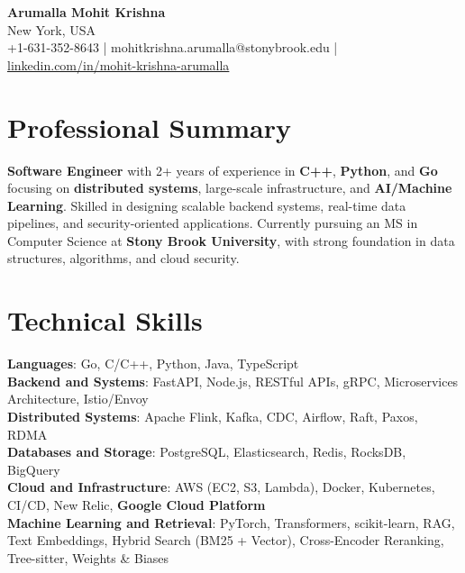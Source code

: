 \documentclass[letterpaper,11pt]{article}
\begin{document}
\begin{center}
  {\Large \textbf{Arumalla Mohit Krishna}} \\
  New York, USA \\
  +1-631-352-8643 \enspace | \enspace mohitkrishna.arumalla@stonybrook.edu \enspace | \enspace \href{https://www.linkedin.com/in/mohit-krishna-arumalla}{linkedin.com/in/mohit-krishna-arumalla}
\end{center}

\section{Professional Summary}
  \begin{itemize}[leftmargin=0.15in, label={}]
    \small{\item{
     \textbf{Software Engineer} with 2+ years of experience in \textbf{C++}, \textbf{Python}, and \textbf{Go} focusing on \textbf{distributed systems}, large-scale infrastructure, and \textbf{AI/Machine Learning}. Skilled in designing scalable backend systems, real-time data pipelines, and security-oriented applications. Currently pursuing an MS in Computer Science at \textbf{Stony Brook University}, with strong foundation in data structures, algorithms, and cloud security.
    }}
  \end{itemize}
\vspace{-16pt}

\section{Technical Skills}
 \begin{itemize}[leftmargin=0.15in, label={}]
    \small{\item{
     \textbf{Languages}: Go, C/C++, Python, Java, TypeScript \\
     \textbf{Backend and Systems}: FastAPI, Node.js, RESTful APIs, gRPC, Microservices Architecture, Istio/Envoy \\
     \textbf{Distributed Systems}: Apache Flink, Kafka, CDC, Airflow, Raft, Paxos, RDMA \\
     \textbf{Databases and Storage}: PostgreSQL, Elasticsearch, Redis, RocksDB, BigQuery \\
     \textbf{Cloud and Infrastructure}: AWS (EC2, S3, Lambda), Docker, Kubernetes, CI/CD, New Relic, \textbf{Google Cloud Platform} \\
     \textbf{Machine Learning and Retrieval}: PyTorch, Transformers, scikit-learn, RAG, Text Embeddings, Hybrid Search (BM25 + Vector), Cross-Encoder Reranking, Tree-sitter, Weights \& Biases
    }}
 \end{itemize}
\vspace{-16pt}
\end{document}
